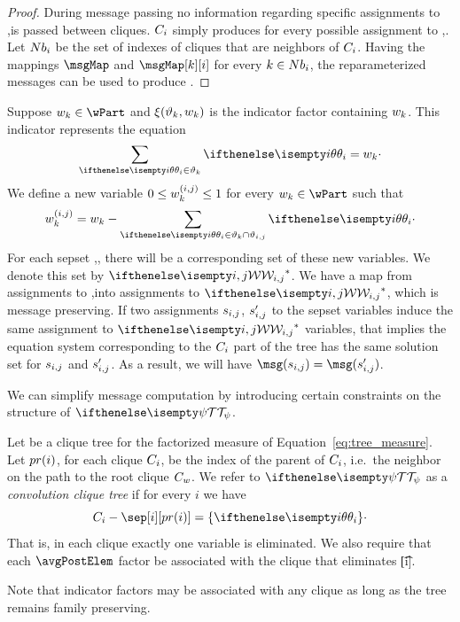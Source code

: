 \begin{proof}
    During message passing no information regarding specific assignments to \sep is passed between cliques.
    $C_{i}$ simply produces \msg for every possible assignment to \sep.
    Let $Nb_i$ be the set of indexes of cliques that are neighbors of $C_{i}$.
    Having the mappings $\msgMap$ and $\msgMap[k][i]$ for every $k \in Nb_i$,
    the reparameterized messages \msg[\altMsgSym][k][i] can be used to produce \msg[\altMsgSym].
\end{proof}

Suppose $\omegaElem_k \in \wPart$ and $\xi(\vartheta_k, w_k)$ is the indicator factor containing
$w_k$.
This indicator represents the equation
\[
    \sum_{\t[i] \in \eqScope_k} \t[i] = \omegaElem_k \cdot
\]
We define a new variable $0 \leq w^{(i,j)}_k \leq 1$ for every \mbox{$\omegaElem_k \in \wPart$} such that
\[
    \omegaElemAlt_k = \omegaElem_k - \sum_{\t[i] \in \eqScope_k \cap \eqScopeSep{i}{j}} \t[i] \cdot
\]
For each sepset \sep, there will be a corresponding set of these new variables.
We denote this set by $\wSep$.
We have a map from assignments to \sep into assignments to $\wSep$, which is message preserving.
If two assignments $s_{i,j}$, $s_{i,j}'$ to the sepset variables induce the same assignment to
$\wSep$ variables, that implies the equation system corresponding to the $C_{i}$ part of the tree has
the same solution set for $s_{i,j}$ and $s_{i,j}'$.
As a result, we will have $\msg(\sepVal) = \msg(\sepVal')$.

We can simplify message computation by introducing certain constraints on the structure of $\ct{\M}$.

\begin{definition}
    Let \ct{\M} be a clique tree for the factorized measure of Equation~\ref{eq:tree_measure}.
    Let $pr(i)$, for each clique $C_{i}$, be the index of the parent of $C_{i}$, i.e.\ the neighbor on the
    path to the root clique $C_{w}$.
    We refer to $\ct{\M}$ as a \emph{convolution clique tree} if for every $i$ we have
    \[\C{i} - \sep[i][\pr{i}] = \{\t[i]\} \cdot\]
    That is, in each clique exactly one variable is eliminated.
    We also require that each $\avgPostElem$ factor be associated with the clique that eliminates \t[i].
\end{definition}

Note that indicator factors may be associated with any clique as long as the tree remains
family preserving.

